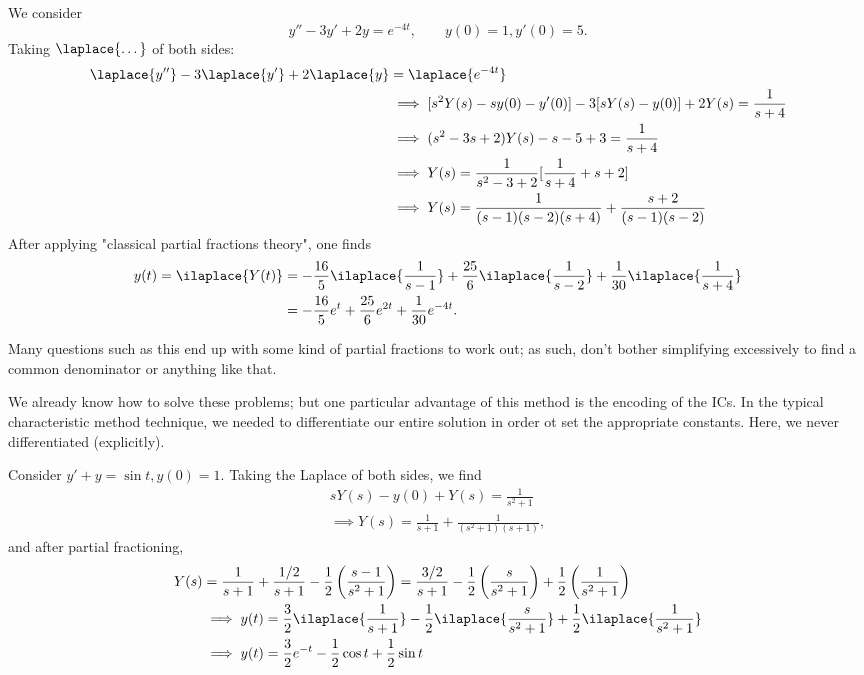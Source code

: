 \begin{example}
    We consider \[
    y'' -3 y' + 2y = e^{-4t}, \qquad y(0) = 1, y'(0) = 5.
    \]
    Taking $\laplace{\dots}$ of both sides:
    \begin{align*}
        \laplace{y''} -3 \laplace{y'} + 2 \laplace{y} &= \laplace{e^{-4t}}\\
        &\implies [s^2 Y(s) - s y(0) - y'(0)] - 3 [s Y(s) - y(0)] + 2Y(s) = \frac{1}{s + 4}\\
        &\implies (s^2 - 3s +2)Y(s) - s - 5 + 3 = \frac{1}{s + 4}\\
        &\implies Y(s) = \frac{1}{s^2 - 3 + 2} [\frac{1}{s + 4} + s + 2]\\
        &\implies Y(s) = \frac{1}{(s - 1)(s-2)(s+4)} + \frac{s + 2}{(s-1)(s-2)}
    \end{align*}
    After applying "classical partial fractions theory", one finds \begin{align*}
        y(t) = \ilaplace{Y(t)} &= - \frac{16}{5} \ilaplace{\frac{1}{s - 1}} + \frac{25}{6} \ilaplace{\frac{1}{s -2}} + \frac{1}{30} \ilaplace{\frac{1}{s + 4}}\\
        &= - \frac{16}{5}e^t + \frac{25}{6}e^{2t} + \frac{1}{30}e^{-4t}.
    \end{align*}
\end{example}
\begin{remark}
    Many questions such as this end up with some kind of partial fractions to work out; as such, don't bother simplifying excessively to find a common denominator or anything like that.
\end{remark}

\begin{remark}
    We already know how to solve these problems; but one particular advantage of this method is the encoding of the ICs. In the typical characteristic method technique, we needed to differentiate our entire solution in order ot set the appropriate constants. Here, we never differentiated (explicitly).
\end{remark}

\begin{example}
    Consider $y' + y = \sin t, y(0) = 1$. Taking the Laplace of both sides, we find \begin{align*}
        s Y(s) - y(0) + Y(s) = \frac{1}{s^2 + 1}\\
        \implies Y(s) = \frac{1}{s+1} + \frac{1}{(s^2 + 1)(s + 1)},
    \end{align*}
    and after partial fractioning, \begin{align*}
        Y(s)&= \frac{1}{s+1} + \frac{1/2}{s+1} - \frac{1}{2}\left(\frac{s - 1}{s^2 + 1}\right) = \frac{3/2}{s + 1} - \frac{1}{2}\left(\frac{s}{s^2+1}\right) + \frac{1}{2}\left(\frac{1}{s^2+1}\right)\\
        &\implies y(t) = \frac{3}{2} \ilaplace{\frac{1}{s + 1}} - \frac{1}{2} \ilaplace{\frac{s}{s^2 + 1}} + \frac{1}{2} \ilaplace{\frac{1}{s^2 + 1}}\\
        &\implies y(t)= \frac{3}{2}e^{-t} - \frac{1}{2} \cos t + \frac{1}{2} \sin t
    \end{align*}
\end{example}

